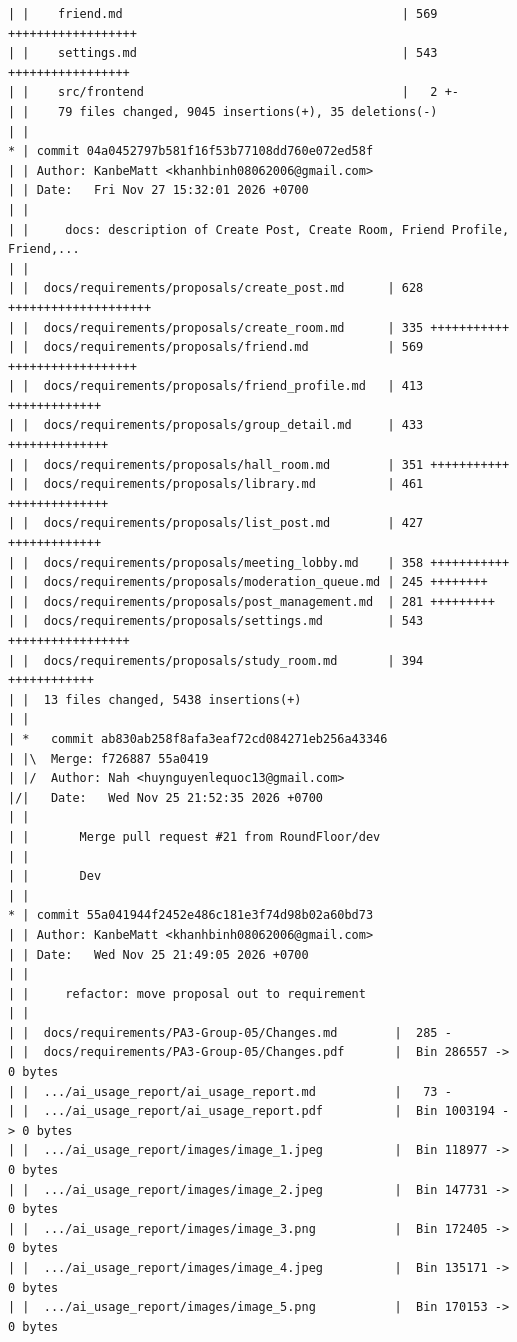 \documentclass[12pt]{article}
\begin{document}
\begin{lstlisting}[numbers=none,breaklines=true]
| |    friend.md                                       | 569 ++++++++++++++++++
| |    settings.md                                     | 543 +++++++++++++++++
| |    src/frontend                                    |   2 +-
| |    79 files changed, 9045 insertions(+), 35 deletions(-)
| |
* | commit 04a0452797b581f16f53b77108dd760e072ed58f
| | Author: KanbeMatt <khanhbinh08062006@gmail.com>
| | Date:   Fri Nov 27 15:32:01 2026 +0700
| |
| |     docs: description of Create Post, Create Room, Friend Profile, Friend,...
| |
| |  docs/requirements/proposals/create_post.md      | 628 ++++++++++++++++++++
| |  docs/requirements/proposals/create_room.md      | 335 +++++++++++
| |  docs/requirements/proposals/friend.md           | 569 ++++++++++++++++++
| |  docs/requirements/proposals/friend_profile.md   | 413 +++++++++++++
| |  docs/requirements/proposals/group_detail.md     | 433 ++++++++++++++
| |  docs/requirements/proposals/hall_room.md        | 351 +++++++++++
| |  docs/requirements/proposals/library.md          | 461 ++++++++++++++
| |  docs/requirements/proposals/list_post.md        | 427 +++++++++++++
| |  docs/requirements/proposals/meeting_lobby.md    | 358 +++++++++++
| |  docs/requirements/proposals/moderation_queue.md | 245 ++++++++
| |  docs/requirements/proposals/post_management.md  | 281 +++++++++
| |  docs/requirements/proposals/settings.md         | 543 +++++++++++++++++
| |  docs/requirements/proposals/study_room.md       | 394 ++++++++++++
| |  13 files changed, 5438 insertions(+)
| |
| *   commit ab830ab258f8afa3eaf72cd084271eb256a43346
| |\  Merge: f726887 55a0419
| |/  Author: Nah <huynguyenlequoc13@gmail.com>
|/|   Date:   Wed Nov 25 21:52:35 2026 +0700
| |
| |       Merge pull request #21 from RoundFloor/dev
| |
| |       Dev
| |
* | commit 55a041944f2452e486c181e3f74d98b02a60bd73
| | Author: KanbeMatt <khanhbinh08062006@gmail.com>
| | Date:   Wed Nov 25 21:49:05 2026 +0700
| |
| |     refactor: move proposal out to requirement
| |
| |  docs/requirements/PA3-Group-05/Changes.md        |  285 -
| |  docs/requirements/PA3-Group-05/Changes.pdf       |  Bin 286557 -> 0 bytes
| |  .../ai_usage_report/ai_usage_report.md           |   73 -
| |  .../ai_usage_report/ai_usage_report.pdf          |  Bin 1003194 -> 0 bytes
| |  .../ai_usage_report/images/image_1.jpeg          |  Bin 118977 -> 0 bytes
| |  .../ai_usage_report/images/image_2.jpeg          |  Bin 147731 -> 0 bytes
| |  .../ai_usage_report/images/image_3.png           |  Bin 172405 -> 0 bytes
| |  .../ai_usage_report/images/image_4.jpeg          |  Bin 135171 -> 0 bytes
| |  .../ai_usage_report/images/image_5.png           |  Bin 170153 -> 0 bytes

\end{lstlisting}
\end{document}
